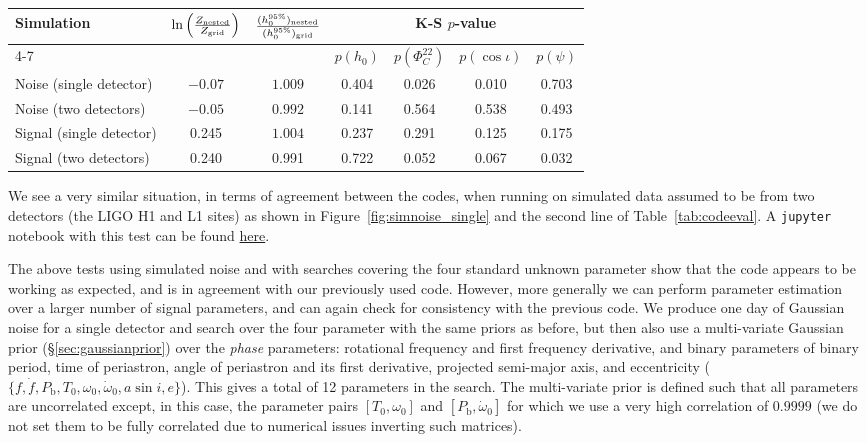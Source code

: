 \begin{table*}[hptb]
\caption{Consistency tests between outputs of the new code, \lppen, and the old code, \lppe, when running on simulated data
and searching over the four parameters $\{h_0, \cos{\iota}, \psi, \Phi_{22}^C\}$.\label{tab:codeeval}}
\begin{center}
\begin{tabular}{l c c | c c c c}
\hline
\multirow{2}{*}{Simulation} & \multirow{2}{*}{$\ln{\left(\frac{Z_{\rm nested}}{Z_{\rm grid}}\right)}$} & \multirow{2}{*}{$\frac{(h_0^{95\%})_{\rm nested}}{(h_0^{95\%})_{\rm grid}}$} & 
\multicolumn{4}{c}{K-S $p$-value} \\ \cline{4-7}
 &  &  & $p(h_0)$ & $p(\Phi_C^{22})$ & $p(\cos{\iota})$ & $p(\psi)$ \\                      
\hline
\hline
Noise (single detector)  & $-0.07$ & $1.009$ & 0.404 & 0.026 & 0.010 & 0.703 \\
Noise (two detectors)    & $-0.05$ & $0.992$ & 0.141 & 0.564 & 0.538 & 0.493 \\
Signal (single detector) & 0.245   & $1.004$ & 0.237 & 0.291 & 0.125 & 0.175 \\
Signal (two detectors)   & 0.240   & 0.991   & 0.722 & 0.052 & 0.067 & 0.032 \\
\hline
\end{tabular}
\end{center}
\end{table*}

We see a very similar situation, in terms of agreement between the codes, when running on simulated data assumed to be from two detectors (the LIGO
H1 and L1 sites) as shown in Figure~\ref{fig:simnoise_single} and the second line of Table~\ref{tab:codeeval}. A {\tt jupyter} notebook with this test
can be found \href{https://github.com/mattpitkin/CW_nested_sampling_doc/blob/master/figures/codeeval/simulations/noise_multidet/SimulatedNoiseTestsMultidetPaper.ipynb}{here}.

The above tests using simulated noise and with searches covering the four standard unknown \gw parameter show that the code appears to
be working as expected, and is in agreement with our previously used code. However, more generally we can perform parameter estimation
over a larger number of signal parameters, and can again check for consistency with the previous code. We produce one day of Gaussian
noise for a single detector and search over the four \gw parameter with the same priors as before, but then also use a multi-variate Gaussian prior (\S\ref{sec:gaussianprior})
over the {\it phase} parameters: rotational frequency and first frequency derivative, and binary parameters of binary period, time of periastron, angle of
periastron and its first derivative, projected semi-major axis, and eccentricity ($\{f,\dot{f},P_{\text{b}}, T_0, \omega_0, \dot{\omega}_0, a\sin{i}, e\}$).
This gives a total of 12 parameters in the search. The multi-variate prior is defined such that all parameters are uncorrelated except, in this case,
the parameter pairs $[T_0, \omega_0]$ and $[P_{\text{b}}, \dot{\omega}_0]$ for which we use a very high correlation of $0.9999$ (we do not set them to
be fully correlated due to numerical issues inverting such matrices).

